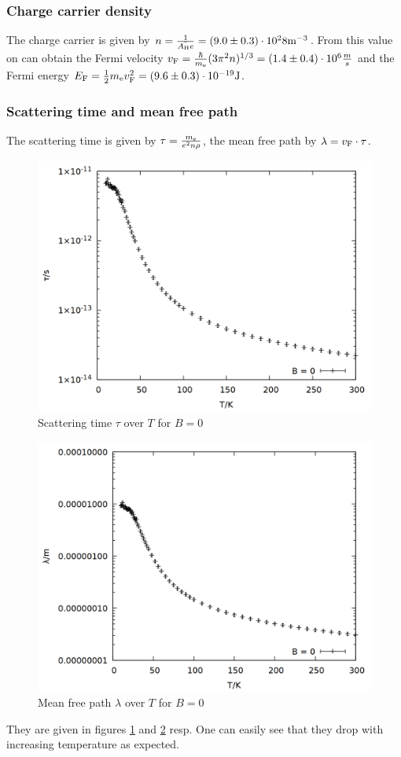 \subsubsection{Charge carrier density}
The charge carrier is given by $n = \frac{1}{\bar{A\ind{H} e}} = (9.0 \pm 0.3) \cdot 10^28 \si{m^{-3}}$. From this value on can obtain the Fermi velocity $v\ind{F} = \frac{\hbar}{m\ind{e}} (3\pi^2 n)^{1/3} = (1.4 \pm 0.4) \cdot 10^6 \frac{m}{s}$ and the Fermi energy $E\ind{F} = \frac{1}{2} m\ind{e} v\ind{F}^2 = (9.6\pm 0.3) \cdot 10^{-19} \si{J}$.

\subsubsection{Scattering time and mean free path}
The scattering time is given by $\tau = \frac{m\ind{e}}{e^2 n \rho}$, the mean free path by $\lambda = v\ind{F} \cdot \tau$. 

\begin{figure}
    \centering
    \includegraphics[width=0.7\linewidth]{data/rho_tau.png}
    \caption{Scattering time $\tau$ over $T$ for $B = 0$}
    \label{fig:rho_tau}
\end{figure}

\begin{figure}
    \centering
    \includegraphics[width=0.7\linewidth]{data/rho_lambda.png}
    \caption{Mean free path $\lambda$ over $T$ for $B = 0$}
    \label{fig:rho_lambda}
\end{figure}

They are given in figures \ref{fig:rho_tau} and \ref{fig:rho_lambda} resp. One can easily see that they drop with increasing temperature as expected.
   